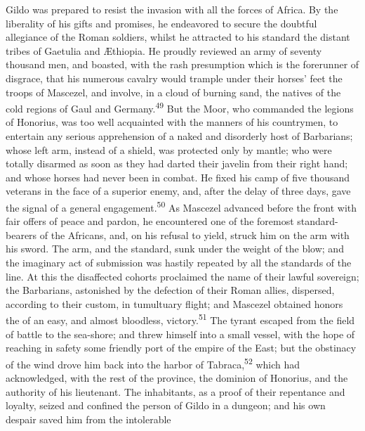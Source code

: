 
Gildo was prepared to resist the invasion with all the forces of
Africa. By the liberality of his gifts and promises, he
endeavored to secure the doubtful allegiance of the Roman
soldiers, whilst he attracted to his standard the distant tribes
of Gaetulia and Æthiopia. He proudly reviewed an army of seventy
thousand men, and boasted, with the rash presumption which is the
forerunner of disgrace, that his numerous cavalry would trample
under their horses’ feet the troops of Mascezel, and involve, in
a cloud of burning sand, the natives of the cold regions of Gaul
and Germany.\textsuperscript{49} But the Moor, who commanded the legions of
Honorius, was too well acquainted with the manners of his
countrymen, to entertain any serious apprehension of a naked and
disorderly host of Barbarians; whose left arm, instead of a
shield, was protected only by mantle; who were totally disarmed
as soon as they had darted their javelin from their right hand;
and whose horses had never been in combat. He fixed his camp of
five thousand veterans in the face of a superior enemy, and,
after the delay of three days, gave the signal of a general
engagement.\textsuperscript{50} As Mascezel advanced before the front with fair
offers of peace and pardon, he encountered one of the foremost
standard-bearers of the Africans, and, on his refusal to yield,
struck him on the arm with his sword. The arm, and the standard,
sunk under the weight of the blow; and the imaginary act of
submission was hastily repeated by all the standards of the line.
At this the disaffected cohorts proclaimed the name of their
lawful sovereign; the Barbarians, astonished by the defection of
their Roman allies, dispersed, according to their custom, in
tumultuary flight; and Mascezel obtained honors the of an easy,
and almost bloodless, victory.\textsuperscript{51} The tyrant escaped from the
field of battle to the sea-shore; and threw himself into a small
vessel, with the hope of reaching in safety some friendly port of
the empire of the East; but the obstinacy of the wind drove him
back into the harbor of Tabraca,\textsuperscript{52} which had acknowledged, with
the rest of the province, the dominion of Honorius, and the
authority of his lieutenant. The inhabitants, as a proof of their
repentance and loyalty, seized and confined the person of Gildo
in a dungeon; and his own despair saved him from the intolerable

